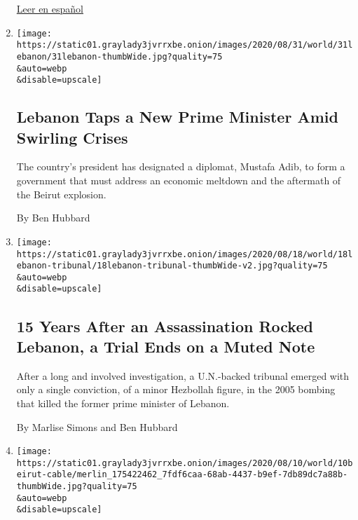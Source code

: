 \begin{enumerate}
  \href{https://www.nytimes3xbfgragh.onion/es/2020/09/04/espanol/mundo/libano-rescate-topos.html}{Leer
  en español}
\item
  \href{/2020/08/31/world/middleeast/lebanon-prime-minister-mustafa-adib.html}{}

  \texttt{[image: https://static01.graylady3jvrrxbe.onion/images/2020/08/31/world/31lebanon/31lebanon-thumbWide.jpg?quality=75\\\&auto=webp\\\&disable=upscale]}

  \hypertarget{lebanon-taps-a-new-prime-minister-amid-swirling-crises}{%
  \subsection{Lebanon Taps a New Prime Minister Amid Swirling
  Crises}\label{lebanon-taps-a-new-prime-minister-amid-swirling-crises}}

  The country's president has designated a diplomat, Mustafa Adib, to
  form a government that must address an economic meltdown and the
  aftermath of the Beirut explosion.

  By Ben Hubbard
\item
  \href{/2020/08/18/world/middleeast/hariri-assassination-trial-hague.html}{}

  \texttt{[image: https://static01.graylady3jvrrxbe.onion/images/2020/08/18/world/18lebanon-tribunal/18lebanon-tribunal-thumbWide-v2.jpg?quality=75\\\&auto=webp\\\&disable=upscale]}

  \hypertarget{15-years-after-an-assassination-rocked-lebanon-a-trial-ends-on-a-muted-note}{%
  \subsection{15 Years After an Assassination Rocked Lebanon, a Trial
  Ends on a Muted
  Note}\label{15-years-after-an-assassination-rocked-lebanon-a-trial-ends-on-a-muted-note}}

  After a long and involved investigation, a U.N.-backed tribunal
  emerged with only a single conviction, of a minor Hezbollah figure, in
  the 2005 bombing that killed the former prime minister of Lebanon.

  By Marlise Simons and Ben Hubbard
\item
  \href{/2020/08/10/world/middleeast/beirut-explosion-us-contractor.html}{}

  \texttt{[image: https://static01.graylady3jvrrxbe.onion/images/2020/08/10/world/10beirut-cable/merlin\_175422462\_7fdf6caa-68ab-4437-b9ef-7db89dc7a88b-thumbWide.jpg?quality=75\\\&auto=webp\\\&disable=upscale]}


\end{enumerate}
